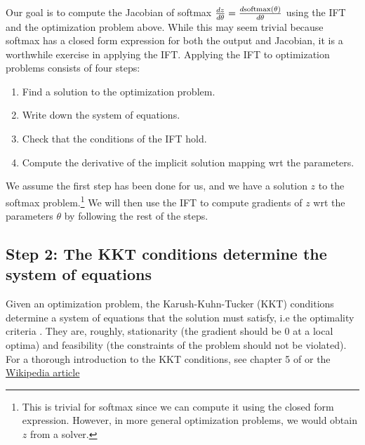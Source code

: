 \documentclass[11pt]{article}
\begin{document}
Our goal is to compute the Jacobian of softmax
$\frac{dz}{d\theta} = \frac{d\mathrm{softmax}(\theta)}{d\theta}$
using the IFT and the optimization problem above.
While this may seem trivial because softmax has a closed form expression for
both the output and Jacobian, it is a worthwhile exercise in applying the IFT.
Applying the IFT to optimization problems consists of four steps:
\begin{enumerate}
\item Find a solution to the optimization problem.
\item Write down the system of equations.
\item Check that the conditions of the IFT hold.
\item Compute the derivative of the implicit solution mapping wrt the parameters.
\end{enumerate}

We assume the first step has been done for us,
and we have a solution $z$ to the softmax problem.\footnote{
This is trivial for softmax since we can compute it using the closed form
expression.
However, in more general optimization problems, we would obtain $z$ from a solver.}
We will then use the IFT to compute gradients of $z$ wrt the parameters $\theta$
by following the rest of the steps.

\subsection*{Step 2: The KKT conditions determine the system of equations}
Given an optimization problem, the Karush-Kuhn-Tucker (KKT) conditions
determine a system of equations that the solution must satisfy,
i.e the optimality criteria \citep{kkt-thesis,kkt}.
They are, roughly, stationarity (the gradient should be 0 at a local optima)
and feasibility (the constraints of the problem should not be violated).
For a thorough introduction to the KKT conditions, see chapter 5 of \citet{bv-cvxbook}
or the \href{https://en.wikipedia.org/wiki/Karush-Kuhn-Tucker\_conditions}{Wikipedia article}
\end{document}
